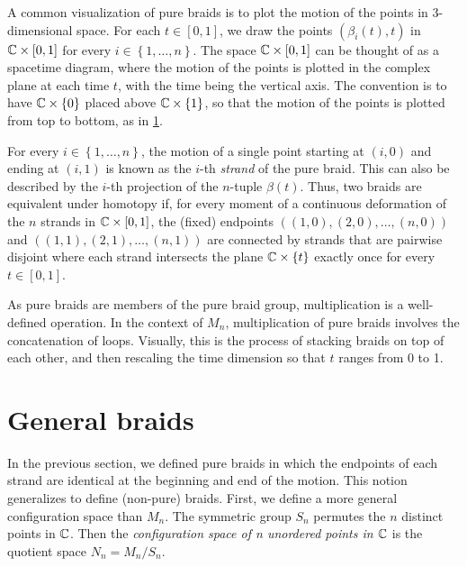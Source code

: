 A common visualization of pure braids is to plot the motion of the points in 3-dimensional space. For each $t\in [0,1]$, we draw the points $\left( \beta_i(t),t \right)$ in $\mathbb{C}\times[0,1]$ for every $i\in\left\{ 1,\dots,n \right\}$. The space $\mathbb{C}\times[0,1]$ can be thought of as a spacetime diagram, where the motion of the points is plotted in the complex plane at each time $t$, with the time being the vertical axis. The convention is to have $\mathbb{C}\times\left\{ 0 \right\}$ placed above $\mathbb{C}\times\left\{ 1 \right\}$, so that the motion of the points is plotted from top to bottom, as in \cref{fig:C_pure_braid}.

\begin{figure}[htbp]
    \centering
    
    \label{fig:C_pure_braid}
\end{figure}

For every $i\in\left\{ 1,\dots,n \right\}$, the motion of a single point starting at $(i,0)$ and ending at $(i,1)$ is known as the $i$-th \textit{strand} of the pure braid. This can also be described by the $i$-th projection of the $n$-tuple $\beta(t)$. Thus, two braids are equivalent under homotopy if, for every moment of a continuous deformation of the $n$ strands in $\mathbb{C}\times [0,1]$, the (fixed) endpoints $((1,0),(2,0),\dots,(n,0))$ and $((1,1),(2,1),\dots,(n,1))$ are connected by strands that are pairwise disjoint where each strand intersects the plane $\mathbb{C}\times\left\{ t \right\}$ exactly once for every $t\in[0,1]$.

As pure braids are members of the pure braid group, multiplication is a well-defined operation. In the context of $M_n$, multiplication of pure braids involves the concatenation of loops. Visually, this is the process of stacking braids on top of each other, and then rescaling the time dimension so that $t$ ranges from 0 to 1.

\section{General braids}
In the previous section, we defined pure braids in which the endpoints of each strand are identical at the beginning and end of the motion. This notion generalizes to define (non-pure) braids. First, we define a more general configuration space than $M_n$. The symmetric group $S_n$ permutes the $n$ distinct points in $\mathbb{C}$. Then the \textit{configuration space of n unordered points in $\mathbb{C}$} is the quotient space $N_n = M_n/S_n$.

